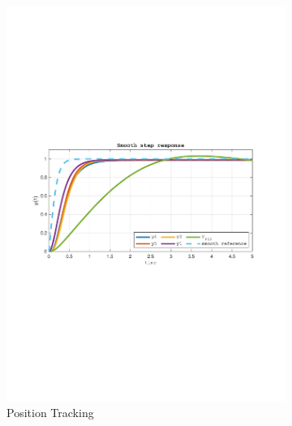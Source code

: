 \documentclass[a4paper, 12pt]{article}
\begin{document}
\begin{figure}[h!]
    \centering
    \begin{subfigure}[b]{0.45\textwidth}
        \includegraphics[width=\textwidth]
        {Figures/fig06a.pdf}
            \caption{Position Tracking}
        \label{fig:fig06a}
    \end{subfigure}
    \begin{subfigure}[b]{0.45\textwidth}

\end{subfigure}
\end{figure}
\end{document}

